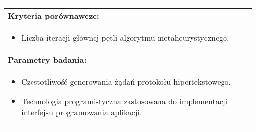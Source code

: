 \begin{longtable}[c]{|llll|}
{    }                                                           \\ \hline
    \multicolumn{4}{|l|}{\textbf{Kryteria porównawcze:}}                             \\ \hline
    \multicolumn{4}{|p{\linewidth}|}{
        \begin{itemize}
            \item Liczba iteracji głównej pętli algorytmu metaheurystycznego.
        \end{itemize}
    }                                                           \\ \hline
    \multicolumn{4}{|l|}{\textbf{Parametry badania:}}                                \\ \hline
    \multicolumn{4}{|p{\linewidth}|}{
        \begin{itemize}
            \item Częstotliwość generowania żądań protokołu hipertekstowego.
            \item Technologia programistyczna zastosowana do implementacji interfejsu programowania aplikacji.
        \end{itemize}
    }                                                           \\ \hline
\end{longtable}


